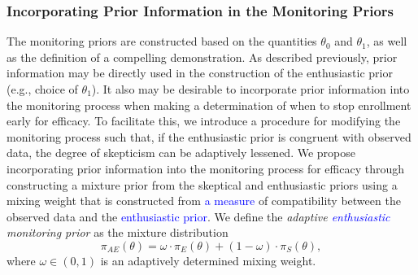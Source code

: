 \documentclass[AMA,STIX1COL,doublespace]{WileyNJD-v2}
\begin{document}
\subsubsection{Incorporating Prior Information in the Monitoring Priors}\label{sec:incorporating}
The monitoring priors are constructed based on the quantities $\theta_0$ and $\theta_1$, as well as the definition of a compelling demonstration. 
%
As described previously, prior information may be directly used in the construction of the enthusiastic prior (e.g., choice of $\theta_1$).
%
It also may be desirable to incorporate prior information into the monitoring process when making a determination of when to stop enrollment 
early for efficacy.
%
To facilitate this, we introduce a procedure for modifying the monitoring process such that, if the enthusiastic prior is congruent with observed data, the degree of skepticism can be adaptively lessened.
We propose incorporating prior information into the monitoring process for efficacy through constructing a mixture prior
from the skeptical and enthusiastic priors using a mixing weight that is constructed from \textcolor{blue}{a measure} of compatibility between the
observed data and the \textcolor{blue}{enthusiastic prior}. 
We define the \textit{adaptive \textcolor{blue}{enthusiastic} monitoring prior} as the mixture distribution	
\begin{equation}\label{eq:inference_prior}
	\pi_{AE}\left(\theta\right)=\omega\cdot\pi_E(\theta)+(1 - \omega)\cdot \pi_S(\theta),
\end{equation}
where $\omega\in(0,1)$ is an adaptively determined mixing weight. %
\end{document}
